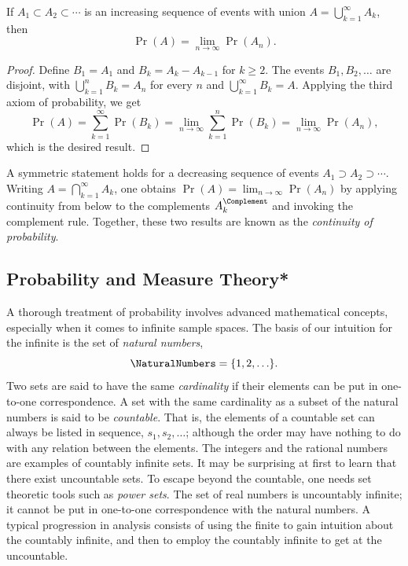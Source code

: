 \begin{proposition}
If $A_1 \subset A_2 \subset \cdots$ is an increasing sequence of events with union $A = \bigcup_{k=1}^{\infty} A_k$, then
\begin{equation*}
\Pr (A) = \lim_{n \to \infty} \Pr (A_n) .
\end{equation*}
\end{proposition}
\begin{proof}
Define $B_1 = A_1$ and $B_k = A_k - A_{k-1}$ for $k \geq 2$.
The events $B_1, B_2, \ldots$ are disjoint, with $\bigcup_{k=1}^{n} B_k = A_n$ for every $n$ and $\bigcup_{k=1}^{\infty} B_k = A$.
Applying the third axiom of probability, we get
\begin{equation*}
\Pr (A)
= \sum_{k=1}^{\infty} \Pr (B_k)
= \lim_{n \to \infty} \sum_{k=1}^{n} \Pr (B_k)
= \lim_{n \to \infty} \Pr (A_n) ,
\end{equation*}
which is the desired result.
\end{proof}

A symmetric statement holds for a decreasing sequence of events $A_1 \supset A_2 \supset \cdots$.
Writing $A = \bigcap_{k=1}^{\infty} A_k$, one obtains $\Pr (A) = \lim_{n \to \infty} \Pr (A_n)$ by applying continuity from below to the complements $A_k^{\Complement}$ and invoking the complement rule.
Together, these two results are known as the \emph{continuity of probability}.


\subsection{Probability and Measure Theory*}

A thorough treatment of probability involves advanced mathematical concepts, especially when it comes to infinite sample spaces.
The basis of our intuition for the infinite is the set of \emph{natural numbers},
\begin{equation*}
\NaturalNumbers = \{ 1, 2, \ldots \}.
\end{equation*}
Two sets are said to have the same \emph{cardinality} if their elements can be put in one-to-one correspondence.
A set with the same cardinality as a subset of the natural numbers is said to be \emph{countable}.
That is, the elements of a countable set can always be listed in sequence, $s_1, s_2, \ldots$; although the order may have nothing to do with any relation between the elements.
The integers and the rational numbers are examples of countably infinite sets.
It may be surprising at first to learn that there exist uncountable sets.
To escape beyond the countable, one needs set theoretic tools such as \emph{power sets}.
The set of real numbers is uncountably infinite; it cannot be put in one-to-one correspondence with the natural numbers.
A typical progression in analysis consists of using the finite to gain intuition about the countably infinite, and then to employ the countably infinite to get at the uncountable.

